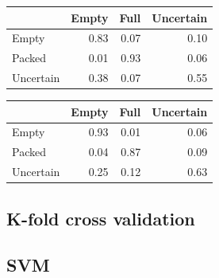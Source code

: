 \documentclass[a4paper, 11pt, table]{article}
\begin{document}
\begin{center}
\begin{tabular}{lrrr}
\hline
 & Empty & Full & Uncertain \\ 
\hline 
Empty & 0.83 & 0.07 & 0.10 \\ 
Packed & 0.01 & 0.93 & 0.06 \\ 
Uncertain & 0.38 & 0.07 & 0.55 \\ 
\end{tabular} 
\end{center}

\begin{center}
\begin{tabular}{lrrr}
\hline
 & Empty & Full & Uncertain \\ 
\hline 
Empty & 0.93 & 0.01 & 0.06 \\ 
Packed & 0.04 & 0.87 & 0.09 \\ 
Uncertain & 0.25 & 0.12 & 0.63 \\ 
\end{tabular} 
\end{center}

\subsection{K-fold cross validation}

\subsection{SVM}
\end{document}
